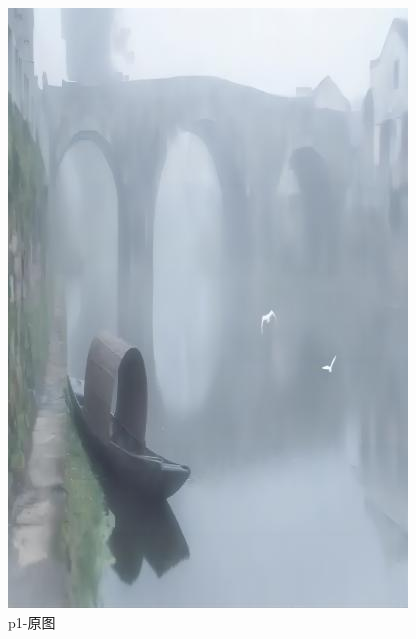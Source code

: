 \documentclass[12pt]{article}
\begin{document}
\begin{figure}[!h]
    \centering
    \begin{minipage}[t]{0.24\linewidth}
        \centering
        \includegraphics[width=0.9\linewidth]{sample_pictures/p1.jpg}
        \caption*{p1-原图}
    \end{minipage}
    \begin{minipage}[t]{0.24\linewidth}
        \centering

\end{minipage}
\end{figure}
\end{document}
